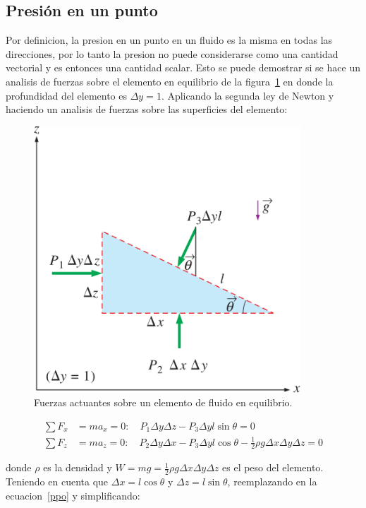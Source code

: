 \documentclass[10pt, oneside]{article}
\begin{document}
\subsection{Presi\'on en un punto}
Por definicion, la presion en un punto en un fluido es la misma en todas las direcciones, por lo tanto la presion no puede considerarse como una cantidad vectorial y es entonces una cantidad scalar. Esto se puede demostrar si se hace un analisis de fuerzas sobre el elemento en equilibrio de la figura~\ref{ppoint} en donde la profundidad del elemento es $\Delta y = 1$. Aplicando la segunda ley de Newton y haciendo un analisis de fuerzas sobre las superficies del elemento:
\begin{figure}[h]
\centering
\includegraphics[width=10cm]{ppoint}
\caption{Fuerzas actuantes sobre un elemento de fluido en equilibrio.}
\label{ppoint}
\end{figure}


\begin{equation}
\begin{split}
\sum F_x &= ma_x = 0: \quad P_1 \Delta y \Delta z - P_3 \Delta y l \sin \theta = 0 \\
\sum F_z &= ma_z = 0: \quad P_2 \Delta y \Delta x - P_3 \Delta y l \cos \theta - \frac{1}{2}\rho g \Delta x \Delta y \Delta z = 0
\label{ppo}
\end{split}
\end{equation}

donde $\rho$ es la densidad y $W = mg = \frac{1}{2} \rho g \Delta x \Delta y \Delta z$ es el peso del elemento. Teniendo en cuenta que $\Delta x = l \cos \theta$ y $\Delta z = l \sin \theta$, reemplazando en la ecuacion~\ref{ppo} y simplificando:
\end{document}
